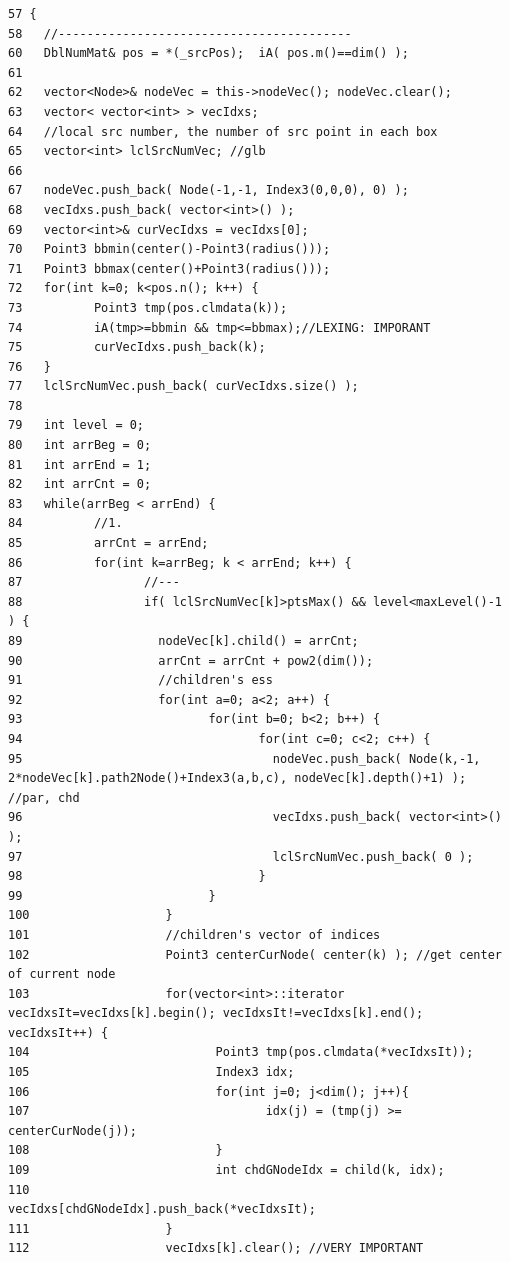 \footnotesize\begin{verbatim}57 {
58   //-----------------------------------------
60   DblNumMat& pos = *(_srcPos);  iA( pos.m()==dim() );
61   
62   vector<Node>& nodeVec = this->nodeVec(); nodeVec.clear();
63   vector< vector<int> > vecIdxs;  
64   //local src number, the number of src point in each box
65   vector<int> lclSrcNumVec; //glb 
66   
67   nodeVec.push_back( Node(-1,-1, Index3(0,0,0), 0) );
68   vecIdxs.push_back( vector<int>() );
69   vector<int>& curVecIdxs = vecIdxs[0];
70   Point3 bbmin(center()-Point3(radius()));
71   Point3 bbmax(center()+Point3(radius()));
72   for(int k=0; k<pos.n(); k++) {
73          Point3 tmp(pos.clmdata(k));     
74          iA(tmp>=bbmin && tmp<=bbmax);//LEXING: IMPORANT
75          curVecIdxs.push_back(k);
76   }
77   lclSrcNumVec.push_back( curVecIdxs.size() );
78   
79   int level = 0;
80   int arrBeg = 0;
81   int arrEnd = 1;
82   int arrCnt = 0;
83   while(arrBeg < arrEnd) {
84          //1.
85          arrCnt = arrEnd;
86          for(int k=arrBeg; k < arrEnd; k++) {
87                 //---
88                 if( lclSrcNumVec[k]>ptsMax() && level<maxLevel()-1 ) {
89                   nodeVec[k].child() = arrCnt;
90                   arrCnt = arrCnt + pow2(dim());
91                   //children's ess                
92                   for(int a=0; a<2; a++) {
93                          for(int b=0; b<2; b++) {
94                                 for(int c=0; c<2; c++) {
95                                   nodeVec.push_back( Node(k,-1, 2*nodeVec[k].path2Node()+Index3(a,b,c), nodeVec[k].depth()+1) ); //par, chd
96                                   vecIdxs.push_back( vector<int>() );
97                                   lclSrcNumVec.push_back( 0 );
98                                 }
99                          }
100                   }
101                   //children's vector of indices
102                   Point3 centerCurNode( center(k) ); //get center of current node
103                   for(vector<int>::iterator vecIdxsIt=vecIdxs[k].begin(); vecIdxsIt!=vecIdxs[k].end(); vecIdxsIt++) {
104                          Point3 tmp(pos.clmdata(*vecIdxsIt));
105                          Index3 idx;
106                          for(int j=0; j<dim(); j++){
107                                 idx(j) = (tmp(j) >= centerCurNode(j));
108                          }
109                          int chdGNodeIdx = child(k, idx);
110                          vecIdxs[chdGNodeIdx].push_back(*vecIdxsIt);
111                   }
112                   vecIdxs[k].clear(); //VERY IMPORTANT

\end{verbatim}
